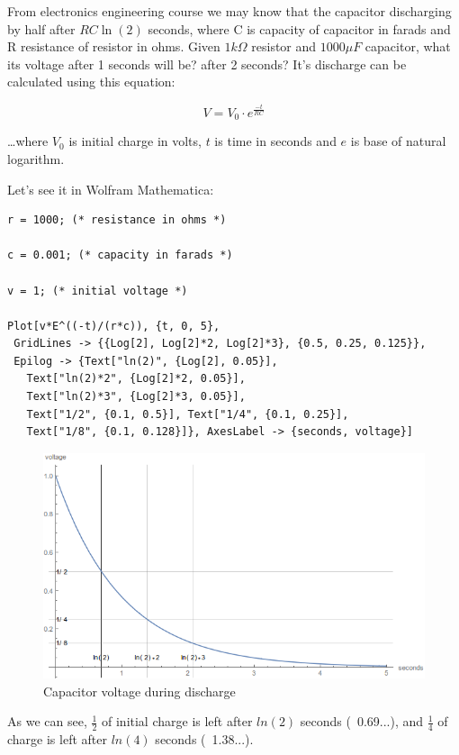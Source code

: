 From electronics engineering course we may know that the capacitor discharging by half after $RC\ln(2)$ seconds,
where C is capacity of capacitor in farads and R resistance of resistor in ohms.
Given $1k\Omega$ resistor and $1000 \mu F$ capacitor, what its voltage after 1 seconds will be? after 2 seconds?
It's discharge can be calculated using this equation:

\LARGE\[
V=V_0 \cdot e^{\frac{-t}{RC}}
\]
\normalsize

\dots where $V_0$ is initial charge in volts, $t$ is time in seconds and $e$ is base of natural logarithm.

Let's see it in Wolfram Mathematica:

\begin{lstlisting}[caption=Wolfram Mathematica]
r = 1000; (* resistance in ohms *)

c = 0.001; (* capacity in farads *)

v = 1; (* initial voltage *)

Plot[v*E^((-t)/(r*c)), {t, 0, 5}, 
 GridLines -> {{Log[2], Log[2]*2, Log[2]*3}, {0.5, 0.25, 0.125}},
 Epilog -> {Text["ln(2)", {Log[2], 0.05}], 
   Text["ln(2)*2", {Log[2]*2, 0.05}], 
   Text["ln(2)*3", {Log[2]*3, 0.05}],
   Text["1/2", {0.1, 0.5}], Text["1/4", {0.1, 0.25}], 
   Text["1/8", {0.1, 0.128}]}, AxesLabel -> {seconds, voltage}]
\end{lstlisting}

\begin{figure}[H]
\centering
\includegraphics[scale=0.66]{log/capacitor_discharge.png}
\caption{Capacitor voltage during discharge}
\end{figure}

As we can see, $\frac{1}{2}$ of initial charge is left after $ln(2)$ seconds (~0.69...), 
and $\frac{1}{4}$ of charge is left after $ln(4)$ seconds (~1.38...).

